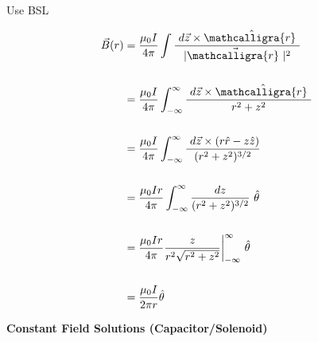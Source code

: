 \documentclass[12pt]{article}
\newcommand{\scripty}[1]{\ensuremath{\mathcalligra{#1}}}
\newcommand*{\cursrr}{\scripty{r}\ }
\begin{document}
\begin{minipage}[t]{0.45\textwidth}
	Use BSL

	\begin{align*}
		\vec{B}(r) &= \frac{\mu_0 I}{4 \pi}
			\int \frac{ \ d\vec{z} \times \hat{\cursrr} }{|\vec{ \cursrr } |^2} \\ \\
		&= \frac{\mu_0 I}{4 \pi} 
			\int_{-\infty}^{\infty} \frac{ \ d\vec{z} \times \hat{\cursrr} }{r^2 + z^2} \\ \\
		&= \frac{\mu_0 I}{4 \pi} 
			\int_{-\infty}^{\infty} \frac{ \ d\vec{z} \times (r\hat{r} - z\hat{z}) }{ (r^2 + z^2)^{3/2} } \\ \\
		&= \frac{\mu_0 I r}{4 \pi} 
			\int_{-\infty}^{\infty} \frac{dz}{ (r^2 + z^2)^{3/2} } \ \hat{\theta} \\ \\
		&= \frac{\mu_0 I r}{4 \pi} 
			\frac{z}{ r^2 \sqrt{r^2 + z^2} } \bigg|_{-\infty}^{\infty} \ \hat{\theta} \\ \\
		&= \frac{\mu_0 I }{2 \pi r} \hat{\theta}
	\end{align*}
\end{minipage}

%
%
%
\newpage \noindent 

\textbf{Constant Field Solutions (Capacitor/Solenoid)}
\end{document}
